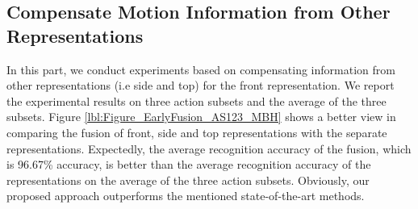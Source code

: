\documentclass[review]{elsarticle}
\begin{document}
\begin{table}
\begin{center}
		
	\end{center}
	\caption{\label{lbl:AS123ConfusionMatrix}Confusion matrices on three action subsets. Notice that action names are identified by indices of actions in table \ref{lbl:20actions}}
\end{table}

\subsection{Compensate Motion Information from Other Representations}
In this part, we conduct experiments based on compensating information from other representations (i.e side and top) for the front representation. We report the experimental results on three action subsets and the average of the three subsets. Figure \ref{lbl:Figure_EarlyFusion_AS123_MBH} shows a better view in comparing the fusion of front, side and top representations with the separate representations. Expectedly, the average recognition accuracy of the fusion, which is 96.67\% accuracy, is better than the average recognition accuracy of the representations on the average of the three action subsets. Obviously, our proposed approach outperforms the mentioned state-of-the-art methods.
 
\end{document}
